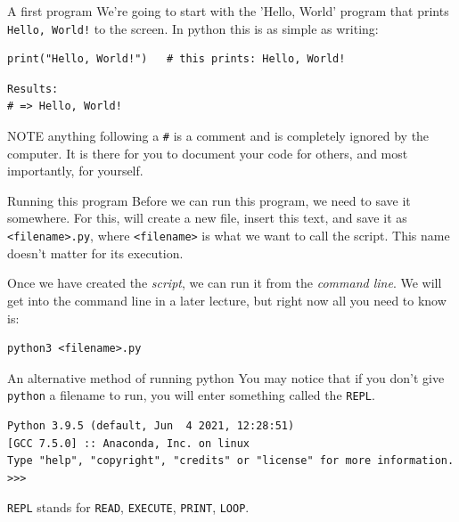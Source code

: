 \documentclass[10pt]{beamer}
\begin{document}
\begin{frame}[label={sec:orgff6fb78},fragile]{A first program}
 We're going to start with the 'Hello, World' program that prints \texttt{Hello, World!} to the
screen. In python this is as simple as writing:

\begin{verbatim}
print("Hello, World!")   # this prints: Hello, World!
\end{verbatim}

\begin{verbatim}
Results: 
# => Hello, World!
\end{verbatim}


\alert{NOTE} anything following a \texttt{\#} is a comment and is completely ignored by the
computer. It is there for you to document your code for others, and most
importantly, for yourself.
\end{frame}

\begin{frame}[label={sec:org3b35d04},fragile]{Running this program}
 Before we can run this program, we need to save it somewhere. For this, will
create a new file, insert this text, and save it as \texttt{<filename>.py}, where
\texttt{<filename>} is what we want to call the script. This name doesn't matter for its
execution.

Once we have created the \emph{script}, we can run it from the \emph{command line}. We will
get into the command line in a later lecture, but right now all you need to know
is:

\begin{verbatim}
python3 <filename>.py
\end{verbatim}
\end{frame}

\begin{frame}[label={sec:org8e48dfa},fragile]{An alternative method of running python}
 You may notice that if you don't give \texttt{python} a filename to run, you will enter
something called the \texttt{REPL}.

\begin{verbatim}
Python 3.9.5 (default, Jun  4 2021, 12:28:51) 
[GCC 7.5.0] :: Anaconda, Inc. on linux
Type "help", "copyright", "credits" or "license" for more information.
>>> 
\end{verbatim}

\texttt{REPL} stands for \texttt{READ}, \texttt{EXECUTE}, \texttt{PRINT}, \texttt{LOOP}.
\end{frame}
\end{document}
